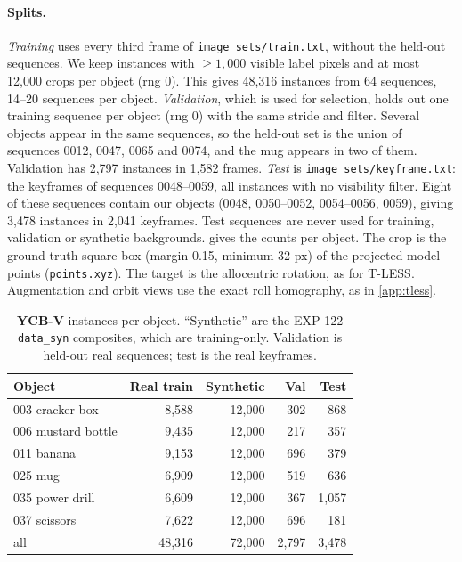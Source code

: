 \paragraph{Splits.}
\emph{Training} uses every third frame of \texttt{image\_sets/train.txt}, without the held-out sequences. We keep instances with $\ge1{,}000$ visible label pixels and at most 12{,}000 crops per object (rng 0). This gives 48{,}316 instances from 64 sequences, 14--20 sequences per object.
\emph{Validation}, which is used for selection, holds out one training sequence per object (rng 0) with the same stride and filter. Several objects appear in the same sequences, so the held-out set is the union of sequences 0012, 0047, 0065 and 0074, and the mug appears in two of them. Validation has 2{,}797 instances in 1{,}582 frames.
\emph{Test} is \texttt{image\_sets/keyframe.txt}: the keyframes of sequences 0048--0059, all instances with no visibility filter. Eight of these sequences contain our objects (0048, 0050--0052, 0054--0056, 0059), giving 3{,}478 instances in 2{,}041 keyframes. Test sequences are never used for training, validation or synthetic backgrounds.
 gives the counts per object.
The crop is the ground-truth square box (margin 0.15, minimum 32 px) of the projected model points (\texttt{points.xyz}). The target is the allocentric rotation, as for T-LESS. Augmentation and orbit views use the exact roll homography, as in \cref{app:tless}.

\begin{table}[t]
  \centering\footnotesize
  \setlength{\tabcolsep}{3pt}
  \begin{tabular}{lrrrr}
    \toprule
    Object & Real train & Synthetic & Val & Test \\
    \midrule
    003 cracker box     & 8{,}588 & 12{,}000 & 302 &   868 \\
    006 mustard bottle  & 9{,}435 & 12{,}000 & 217 &   357 \\
    011 banana          & 9{,}153 & 12{,}000 & 696 &   379 \\
    025 mug             & 6{,}909 & 12{,}000 & 519 &   636 \\
    035 power drill     & 6{,}609 & 12{,}000 & 367 & 1{,}057 \\
    037 scissors        & 7{,}622 & 12{,}000 & 696 &   181 \\
    \midrule
    all                 & 48{,}316 & 72{,}000 & 2{,}797 & 3{,}478 \\
    \bottomrule
  \end{tabular}
  \caption{\textbf{YCB-V} instances per object. ``Synthetic'' are the EXP-122 \texttt{data\_syn} composites, which are training-only. Validation is held-out real sequences; test is the real keyframes.}
  \label{app:tab:ycbv}
\end{table}

